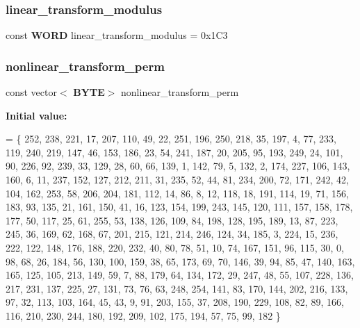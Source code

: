 \subsubsection{linear\+\_\+transform\+\_\+modulus}
{\footnotesize\ttfamily const \textbf{ W\+O\+RD} linear\+\_\+transform\+\_\+modulus = 0x1\+C3}

\mbox{\label{_kuznyechik_8cpp_aa0c8e6dc9f02dc71cd7d0be88e9d6674}} 
\subsubsection{nonlinear\+\_\+transform\+\_\+perm}
{\footnotesize\ttfamily const vector$<$\textbf{ B\+Y\+TE}$>$ nonlinear\+\_\+transform\+\_\+perm}

{\bfseries Initial value\+:}
\begin{DoxyCode}
= \{
    252, 238, 221, 17, 207, 110, 49, 22, 251, 196,
    250, 218, 35, 197, 4, 77, 233, 119, 240, 219,
    147, 46, 153, 186, 23, 54, 241, 187, 20, 205,
    95, 193, 249, 24, 101, 90, 226, 92, 239, 33,
    129, 28, 60, 66, 139, 1, 142, 79, 5, 132, 2,
    174, 227, 106, 143, 160, 6, 11, 237, 152, 127,
    212, 211, 31, 235, 52, 44, 81, 234, 200, 72,
    171, 242, 42, 104, 162, 253, 58, 206, 204, 181,
    112, 14, 86, 8, 12, 118, 18, 191, 114, 19, 71,
    156, 183, 93, 135, 21, 161, 150, 41, 16, 123,
    154, 199, 243, 145, 120, 111, 157, 158, 178, 177,
    50, 117, 25, 61, 255, 53, 138, 126, 109, 84,
    198, 128, 195, 189, 13, 87, 223, 245, 36, 169,
    62, 168, 67, 201, 215, 121, 214, 246, 124, 34,
    185, 3, 224, 15, 236, 222, 122, 148, 176, 188,
    220, 232, 40, 80, 78, 51, 10, 74, 167, 151, 96,
    115, 30, 0, 98, 68, 26, 184, 56, 130, 100, 159,
    38, 65, 173, 69, 70, 146, 39, 94, 85, 47, 140,
    163, 165, 125, 105, 213, 149, 59, 7, 88, 179,
    64, 134, 172, 29, 247, 48, 55, 107, 228, 136,
    217, 231, 137, 225, 27, 131, 73, 76, 63, 248,
    254, 141, 83, 170, 144, 202, 216, 133, 97, 32,
    113, 103, 164, 45, 43, 9, 91, 203, 155, 37,
    208, 190, 229, 108, 82, 89, 166, 116, 210, 230,
    244, 180, 192, 209, 102, 175, 194, 57, 75, 99,
    182
\}
\end{DoxyCode}
